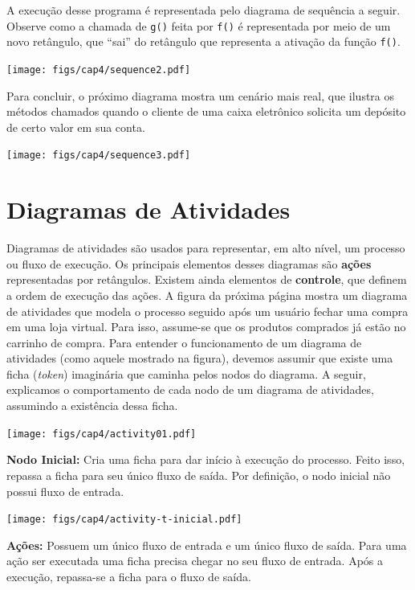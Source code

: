 \documentclass[
  11pt,
  twoside]{book}
\newcommand{\passthrough}[1]{#1}
\begin{document}
A execução desse programa é representada pelo diagrama de sequência a
seguir. Observe como a chamada de \passthrough{\lstinline!g()!} feita
por \passthrough{\lstinline!f()!} é representada por meio de um novo
retângulo, que ``sai'' do retângulo que representa a ativação da função
\passthrough{\lstinline!f()!}.

\texttt{[image: figs/cap4/sequence2.pdf]}

Para concluir, o próximo diagrama mostra um cenário mais real, que
ilustra os métodos chamados quando o cliente de uma caixa eletrônico
solicita um depósito de certo valor em sua conta.

\texttt{[image: figs/cap4/sequence3.pdf]}

\hypertarget{diagramas-de-atividades}{%
\section{Diagramas de Atividades}\label{diagramas-de-atividades}}

 

Diagramas de atividades são usados para representar, em alto nível, um
processo ou fluxo de execução. Os principais elementos desses diagramas
são \textbf{ações} representadas por retângulos. Existem ainda elementos
de \textbf{controle}, que definem a ordem de execução das ações. A
figura da próxima página mostra um diagrama de atividades que modela o
processo seguido após um usuário fechar uma compra em uma loja virtual.
Para isso, assume-se que os produtos comprados já estão no carrinho de
compra. Para entender o funcionamento de um diagrama de atividades (como
aquele mostrado na figura), devemos assumir que existe uma ficha
(\emph{token}) imaginária que caminha pelos nodos do diagrama. A seguir,
explicamos o comportamento de cada nodo de um diagrama de atividades,
assumindo a existência dessa ficha.

\newpage

\texttt{[image: figs/cap4/activity01.pdf]}

\textbf{Nodo Inicial:} Cria uma ficha para dar início à execução do
processo. Feito isso, repassa a ficha para seu único fluxo de saída. Por
definição, o nodo inicial não possui fluxo de entrada.

\texttt{[image: figs/cap4/activity-t-inicial.pdf]}

\textbf{Ações:} Possuem um único fluxo de entrada e um único fluxo de
saída. Para uma ação ser executada uma ficha precisa chegar no seu fluxo
de entrada. Após a execução, repassa-se a ficha para o fluxo de saída.
\end{document}
